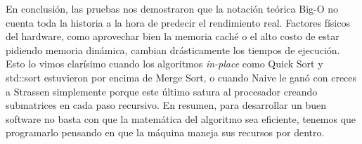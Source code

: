 En conclusión, las pruebas nos demostraron que la notación teórica Big-O no cuenta toda la historia a la hora de predecir el rendimiento real. Factores físicos del hardware,
como aprovechar bien la memoria caché o el alto costo de estar pidiendo memoria dinámica, cambian drásticamente los tiempos de ejecución.
Esto lo vimos clarísimo cuando los algoritmos \textit{in-place} como Quick Sort y std::sort estuvieron por encima de Merge Sort, o cuando Naive
le ganó con creces a Strassen simplemente porque este último satura al procesador creando submatrices en cada paso recursivo.
En resumen, para desarrollar un buen software no basta con que la matemática del algoritmo sea eficiente, tenemos que programarlo pensando en que la máquina maneja sus recursos por dentro.